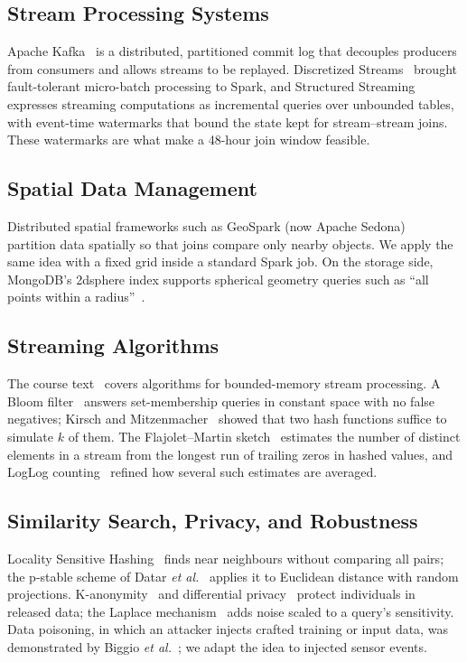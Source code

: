 \documentclass[10pt,journal,compsoc]{IEEEtran}
\begin{document}
\subsection{Stream Processing Systems}
Apache Kafka~\cite{kreps2011kafka} is a distributed, partitioned commit log that decouples producers from consumers and allows streams to be replayed. Discretized Streams~\cite{zaharia2013dstreams} brought fault-tolerant micro-batch processing to Spark, and Structured Streaming~\cite{armbrust2018structured} expresses streaming computations as incremental queries over unbounded tables, with event-time watermarks that bound the state kept for stream--stream joins. These watermarks are what make a 48-hour join window feasible.

\subsection{Spatial Data Management}
Distributed spatial frameworks such as GeoSpark (now Apache Sedona)~\cite{yu2015geospark} partition data spatially so that joins compare only nearby objects. We apply the same idea with a fixed grid inside a standard Spark job. On the storage side, MongoDB's 2dsphere index supports spherical geometry queries such as ``all points within a radius''~\cite{mongodb2dsphere}.

\subsection{Streaming Algorithms}
The course text~\cite{leskovec2020mmds} covers algorithms for bounded-memory stream processing. A Bloom filter~\cite{bloom1970} answers set-membership queries in constant space with no false negatives; Kirsch and Mitzenmacher~\cite{kirsch2006lesshashing} showed that two hash functions suffice to simulate $k$ of them. The Flajolet--Martin sketch~\cite{flajolet1985} estimates the number of distinct elements in a stream from the longest run of trailing zeros in hashed values, and LogLog counting~\cite{durand2003loglog} refined how several such estimates are averaged.

\subsection{Similarity Search, Privacy, and Robustness}
Locality Sensitive Hashing~\cite{indyk1998lsh} finds near neighbours without comparing all pairs; the p-stable scheme of Datar \textit{et al.}~\cite{datar2004pstable} applies it to Euclidean distance with random projections. K-anonymity~\cite{sweeney2002kanon} and differential privacy~\cite{dwork2006dp} protect individuals in released data; the Laplace mechanism~\cite{dwork2006calibrating} adds noise scaled to a query's sensitivity. Data poisoning, in which an attacker injects crafted training or input data, was demonstrated by Biggio \textit{et al.}~\cite{biggio2012poisoning}; we adapt the idea to injected sensor events.
\end{document}
